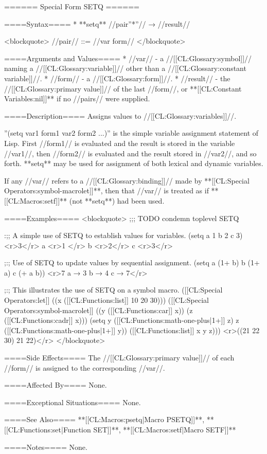 ====== Special Form SETQ ======

====Syntax====
  * **setq** //{pair''*''}// → //result//
  
<blockquote>
//pair// ::= //var form//
</blockquote>

====Arguments and Values====
  * //var// - a //[[CL:Glossary:symbol]]// naming a //[[CL:Glossary:variable]]// other than a //[[CL:Glossary:constant variable]]//.
  * //form// - a //[[CL:Glossary:form]]//.
  * //result// - the //[[CL:Glossary:primary value]]// of the last //form//, or **[[CL:Constant Variables:nil]]** if no //pairs// were supplied.

====Description====
Assigns values to //[[CL:Glossary:variables]]//.

''(setq var1 form1 var2 form2 ...)'' is the simple variable assignment statement of Lisp. First //form1// is evaluated and the result is stored in the variable //var1//, then //form2// is evaluated and the result stored in //var2//, and so forth. **setq** may be used for assignment of both lexical and dynamic variables.

If any //var// refers to a //[[CL:Glossary:binding]]// made by **[[CL:Special Operators:symbol-macrolet]]**, then that //var// is treated as if **[[CL:Macros:setf]]** (not **setq**) had been used.

====Examples====
<blockquote>
;;; TODO condemn toplevel SETQ

:;; A simple use of SETQ to establish values for variables. 
(setq a 1 b 2 c 3) <r>3</r>
a <r>1 </r>
b <r>2</r>
c <r>3</r>

;:; Use of SETQ to update values by sequential assignment. 
(setq a (1+ b) b (1+ a) c (+ a b)) <r>7 a → 3 b → 4 c → 7</r>

;:; This illustrates the use of SETQ on a symbol macro. 
([[CL:Special Operators:let]] ((x ([[CL:Functions:list]] 10 20 30)))
  ([[CL:Special Operators:symbol-macrolet]] ((y ([[CL:Functions:car]] x)) (z ([[CL:Functions:cadr]] x))) 
    (setq y ([[CL:Functions:math-one-plus|1+]] z) z ([[CL:Functions:math-one-plus|1+]] y))
    ([[CL:Functions:list]] x y z))) <r>((21 22 30) 21 22)</r>
</blockquote>

====Side Effects====
The //[[CL:Glossary:primary value]]// of each //form// is assigned to the corresponding //var//.

====Affected By====
None.

====Exceptional Situations====
None.

====See Also====
**[[CL:Macros:psetq|Macro PSETQ]]**, **[[CL:Functions:set|Function SET]]**, **[[CL:Macros:setf|Macro SETF]]**

====Notes====
None.

